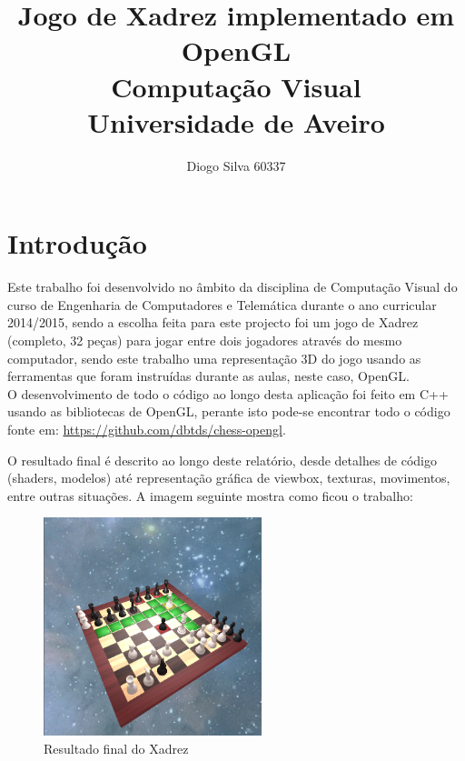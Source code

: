 \documentclass[11pt,a4paper]{report}
\begin{document}
\title{\textbf{Jogo de Xadrez implementado em OpenGL} \\ Computação Visual\\Universidade de Aveiro}
\author{Diogo Silva 60337}
\maketitle

\tableofcontents


\chapter{Introdução}

Este trabalho foi desenvolvido no âmbito da disciplina de Computação Visual do curso de Engenharia de Computadores e Telemática durante o ano curricular 2014/2015, sendo a escolha feita para este projecto foi um jogo de Xadrez (completo, 32 peças) para jogar entre dois jogadores através do mesmo computador, sendo este trabalho uma representação 3D do jogo usando as ferramentas que foram instruídas durante as aulas, neste caso, OpenGL.\\

O desenvolvimento de todo o código ao longo desta aplicação foi feito em C++ usando as bibliotecas de OpenGL, perante isto pode-se encontrar todo o código fonte em: \url{https://github.com/dbtds/chess-opengl}.

O resultado final é descrito ao longo deste relatório, desde detalhes de código (shaders, modelos) até representação gráfica de viewbox, texturas, movimentos, entre outras situações. A imagem seguinte mostra como ficou o trabalho:

\begin{figure}[H]
\centerline{\includegraphics[width=180pt]{images/finalresult.png}}
\caption{Resultado final do Xadrez}
\label{img:complete}
\end{figure}
\end{document}
